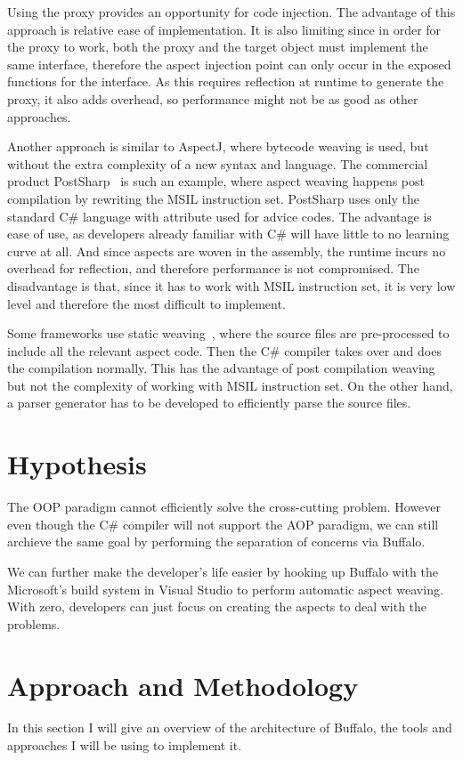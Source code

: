 Using the proxy provides an opportunity for code injection. The advantage of this approach is relative ease of implementation. It is also limiting since in order for the proxy to work, both the proxy and the target object must implement the same interface, therefore the aspect injection point can only occur in the exposed functions for the interface. As this requires reflection at runtime to generate the proxy, it also adds overhead, so performance might not be as good as other approaches.

Another approach is similar to AspectJ, where bytecode weaving is used, but without the extra complexity of a new syntax and language. The commercial product PostSharp~\cite{postsharp} is such an example, where aspect weaving happens post compilation by rewriting the MSIL instruction set. PostSharp uses only the standard C\# language with attribute used for advice codes. The advantage is ease of use, as developers already familiar with C\# will have little to no learning curve at all. And since aspects are woven in the assembly, the runtime incurs no overhead for reflection, and therefore performance is not compromised. The disadvantage is that, since it has to work with MSIL instruction set, it is very low level and therefore the most difficult to implement.

Some frameworks use static weaving~\cite{aspectcs}, where the source files are pre-processed to include all the relevant aspect code. Then the C\# compiler takes over and does the compilation normally. This has the advantage of post compilation weaving but not the complexity of working with MSIL instruction set. On the other hand, a parser generator has to be developed to efficiently parse the source files.

\section{Hypothesis}
The OOP paradigm cannot efficiently solve the cross-cutting problem. However even though the C\# compiler will not support the AOP paradigm, we can still archieve the same goal by performing the separation of concerns via Buffalo.

We can further make the developer's life easier by hooking up Buffalo with the Microsoft's build system in Visual Studio to perform automatic aspect weaving. With zero, developers can just focus on creating the aspects to deal with the problems.

\section{Approach and Methodology}
In this section I will give an overview of the architecture of Buffalo, the tools and approaches I will be using to implement it.

